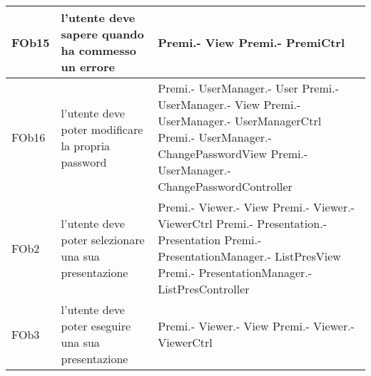 \begin{longtable}{|l|p{5cm}|p{7cm}|}
\hline
FOb15 & l'utente deve sapere quando ha commesso un errore & Premi.- \linebreak View \linebreak Premi.- \linebreak PremiCtrl \linebreak \\
\hline
FOb16 & l'utente deve poter modificare la propria password & Premi.- \linebreak UserManager.- \linebreak User \linebreak Premi.- \linebreak UserManager.- \linebreak View \linebreak Premi.- \linebreak UserManager.- \linebreak UserManagerCtrl \linebreak Premi.- \linebreak UserManager.- \linebreak ChangePasswordView \linebreak Premi.- \linebreak UserManager.- \linebreak ChangePasswordController \linebreak \\
\hline
FOb2 & l'utente deve poter selezionare una sua presentazione & Premi.- \linebreak Viewer.- \linebreak View \linebreak Premi.- \linebreak Viewer.- \linebreak ViewerCtrl \linebreak Premi.- \linebreak Presentation.- \linebreak Presentation \linebreak Premi.- \linebreak PresentationManager.- \linebreak ListPresView \linebreak Premi.- \linebreak PresentationManager.- \linebreak ListPresController \linebreak \\
\hline
FOb3 & l'utente deve poter eseguire una sua presentazione & Premi.- \linebreak Viewer.- \linebreak View \linebreak Premi.- \linebreak Viewer.- \linebreak ViewerCtrl \linebreak \\

\end{longtable}
